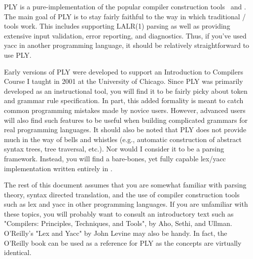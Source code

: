 
PLY is a pure-\py implementation of the popular compiler construction tools
\lex\ and \yacc. The main goal of PLY is to stay fairly faithful to the way in
which traditional / tools work. This includes supporting
LALR(1) parsing as well as providing extensive input validation, error
reporting, and diagnostics. Thus, if you've used yacc in another programming
language, it should be relatively straightforward to use PLY.

Early versions of PLY were developed to support an Introduction to Compilers
Course I taught in 2001 at the University of Chicago. Since PLY was primarily
developed as an instructional tool, you will find it to be fairly picky about
token and grammar rule specification. In part, this added formality is meant to
catch common programming mistakes made by novice users. However, advanced users
will also find such features to be useful when building complicated grammars for
real programming languages. It should also be noted that PLY does not provide
much in the way of bells and whistles (e.g., automatic construction of abstract
syntax trees, tree traversal, etc.). Nor would I consider it to be a parsing
framework. Instead, you will find a bare-bones, yet fully capable lex/yacc
implementation written entirely in \py.

The rest of this document assumes that you are somewhat familiar with parsing
theory, syntax directed translation, and the use of compiler construction tools
such as lex and yacc in other programming languages. If you are unfamiliar with
these topics, you will probably want to consult an introductory text such as
"Compilers: Principles, Techniques, and Tools", by Aho, Sethi, and Ullman.
O'Reilly's "Lex and Yacc" by John Levine may also be handy. In fact, the
O'Reilly book can be used as a reference for PLY as the concepts are virtually
identical.
